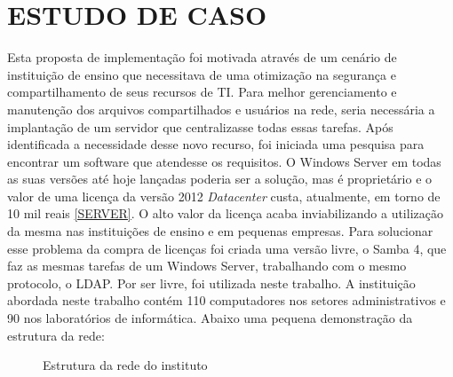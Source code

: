 \chapter{ESTUDO DE CASO}

Esta proposta de implementação foi motivada através de um cenário de instituição de ensino que necessitava de uma otimização na segurança e compartilhamento de seus recursos de TI. Para melhor gerenciamento e manutenção dos arquivos compartilhados e usuários na rede, seria necessária a implantação de um servidor que centralizasse todas essas tarefas.
Após identificada a necessidade desse novo recurso, foi iniciada uma pesquisa para encontrar um software que atendesse os requisitos. O Windows Server em todas as suas versões até hoje lançadas poderia ser a solução, mas é proprietário e o valor de uma licença da versão 2012 \textit{Datacenter} custa, atualmente, em torno de 10 mil reais \ref{SERVER}. O alto valor da licença acaba inviabilizando a utilização da mesma nas instituições  de ensino e em pequenas empresas. 
Para solucionar esse problema da compra de licenças foi criada uma versão livre, o Samba 4, que faz as mesmas tarefas de um Windows Server, trabalhando com o mesmo protocolo, o LDAP. Por ser livre, foi utilizada neste trabalho.
A instituição abordada neste trabalho contém 110 computadores nos setores administrativos e 90 nos laboratórios de informática. Abaixo uma pequena demonstração da estrutura da rede:

\begin{figure}[ht]
   	\centering
   	\caption{Estrutura da rede do instituto}
    \label{rede}
\end{figure}
          				

